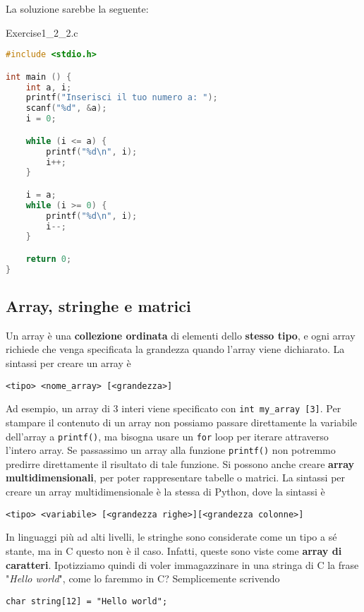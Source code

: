 La soluzione sarebbe la seguente:
\pagebreak
\begin{codeblock}{Exercise1\_2\_2.c}
    \begin{lstlisting}[language = c]
#include <stdio.h>

int main () {
    int a, i;
    printf("Inserisci il tuo numero a: ");
    scanf("%d", &a);
    i = 0;

    while (i <= a) {
        printf("%d\n", i);
        i++;
    }

    i = a;
    while (i >= 0) {
        printf("%d\n", i);
        i--;
    }

    return 0;
}\end{lstlisting}
\end{codeblock}

\subsection{Array, stringhe e matrici}

Un array è una \textbf{collezione ordinata} di elementi dello \textbf{stesso tipo}, e ogni array richiede che venga specificata la grandezza quando l'array viene dichiarato. La sintassi per creare un array è 
\begin{center}
    \verb|<tipo> <nome_array> [<grandezza>]|
\end{center}

Ad esempio, un array di 3 interi viene specificato con \verb|int my_array [3]|. Per stampare il contenuto di un array non possiamo passare direttamente la variabile dell'array a \verb|printf()|, ma bisogna usare un \verb|for| loop per iterare attraverso l'intero array. Se passassimo un array alla funzione \verb|printf()| non potremmo predirre direttamente il risultato di tale funzione.
\nwl
Si possono anche creare \textbf{array multidimensionali}, per poter rappresentare tabelle o matrici. La sintassi per creare un array multidimensionale è la stessa di Python, dove la sintassi è
\begin{center}
    \verb|<tipo> <variabile> [<grandezza righe>][<grandezza colonne>]|
\end{center}

In linguaggi più ad alti livelli, le stringhe sono considerate come un tipo a sé stante, ma in C questo non è il caso. Infatti, queste sono viste come \textbf{array di caratteri}. Ipotizziamo quindi di voler immagazzinare in una stringa di C la frase "\textit{Hello world}", come lo faremmo in C? Semplicemente scrivendo
\begin{center}
    \verb|char string[12] = "Hello world";|
\end{center}

